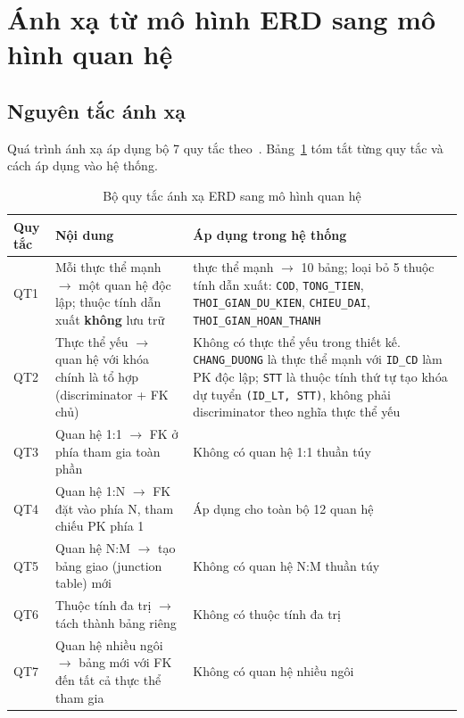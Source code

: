 \documentclass[11pt]{report}
\begin{document}

\section{Ánh xạ từ mô hình ERD sang mô hình quan hệ}
\label{sec:anhxa}

\subsection{Nguyên tắc ánh xạ}
\label{subsec:nguyen_tac_anhxa}

Quá trình ánh xạ áp dụng bộ 7 quy tắc theo~\cite{elmasri2015fundamentals}. Bảng~\ref{tab:quytac_anhxa} tóm tắt từng quy tắc và cách áp dụng vào hệ thống.

\begin{table}[H]
    \centering
    \renewcommand{\tabularxcolumn}[1]{m{#1}}
    \begin{tabularx}{\textwidth}{|>{\raggedright\arraybackslash}l|>{\raggedright\arraybackslash}X|>{\raggedright\arraybackslash}X|} \hline
        \rowcolor{teal!30}
        \textbf{Quy tắc} & \textbf{Nội dung} & \textbf{Áp dụng trong hệ thống} \\ \hline
        QT1 & Mỗi thực thể mạnh $\to$ một quan hệ độc lập; thuộc tính dẫn xuất \textbf{không} lưu trữ & 10 thực thể mạnh $\to$ 10 bảng; loại bỏ 5 thuộc tính dẫn xuất: \texttt{COD}, \texttt{TONG\_TIEN}, \texttt{THOI\_GIAN\_DU\_KIEN}, \texttt{CHIEU\_DAI}, \texttt{THOI\_GIAN\_HOAN\_THANH} \\ \hline
        QT2 & Thực thể yếu $\to$ quan hệ với khóa chính là tổ hợp (discriminator + FK chủ) & Không có thực thể yếu trong thiết kế. \texttt{CHANG\_DUONG} là thực thể mạnh với \texttt{ID\_CD} làm PK độc lập; \texttt{STT} là thuộc tính thứ tự tạo khóa dự tuyển \texttt{(ID\_LT, STT)}, không phải discriminator theo nghĩa thực thể yếu \\ \hline
        QT3 & Quan hệ 1:1 $\to$ FK ở phía tham gia toàn phần & Không có quan hệ 1:1 thuần túy \\ \hline
        QT4 & Quan hệ 1:N $\to$ FK đặt vào phía N, tham chiếu PK phía 1 & Áp dụng cho toàn bộ 12 quan hệ \\ \hline
        QT5 & Quan hệ N:M $\to$ tạo bảng giao (junction table) mới & Không có quan hệ N:M thuần túy \\ \hline
        QT6 & Thuộc tính đa trị $\to$ tách thành bảng riêng & Không có thuộc tính đa trị \\ \hline
        QT7 & Quan hệ nhiều ngôi $\to$ bảng mới với FK đến tất cả thực thể tham gia & Không có quan hệ nhiều ngôi \\ \hline
    \end{tabularx}
    \caption{Bộ quy tắc ánh xạ ERD sang mô hình quan hệ}
    \label{tab:quytac_anhxa}
\end{table}
\end{document}
